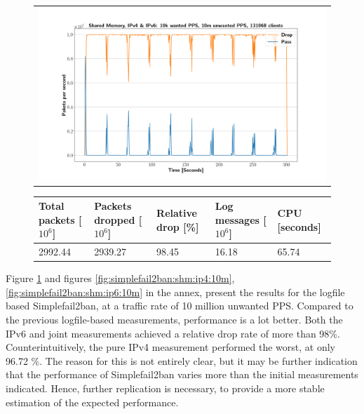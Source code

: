 \pagebreak

\begin{figure}[!h]
	\centering
	\scriptsize
	\begin{tabular}{c}
    	\centerline{\includegraphics[width=1.2\textwidth]{images/simplefail2ban_shm_ipv46_v10k_iv10m_c131068.png}}
	\end{tabular}
	\begin{tabular}{lllll}
		\toprule
		\textbf{Total packets [$10^6$]} & \textbf{Packets dropped [$10^6$]} & \textbf{Relative drop [\%]} & \textbf{Log messages [$10^6$]} & \textbf{CPU [seconds]} \\ \midrule 
		2992.44 & 2939.27 & 98.45 & 16.18 & 65.74 \\
		\bottomrule
	\end{tabular}
	\caption[Simplefail2ban, Shared Memory, IPv4 \& IPv6, 10m \ac{PPS}]{}
	\label{fig:simplefail2ban:shm:ip46:10m}
\end{figure}

Figure \ref{fig:simplefail2ban:shm:ip46:10m} and figures \ref{fig:simplefail2ban:shm:ip4:10m}, \ref{fig:simplefail2ban:shm:ip6:10m} in the annex, present the results
for the logfile based Simplefail2ban, at a traffic rate of 10 million unwanted \ac{PPS}. Compared to the previous logfile-based measurements,
performance is a lot better. Both the \ac{IPv6} and joint measurements achieved a relative drop rate of more than 98\%. Counterintuitively, the
pure \ac{IPv4} measurement performed the worst, at only 96.72 \%. The reason for this is not entirely clear, but it may be further
indication that the performance of Simplefail2ban varies more than the initial measurements indicated. Hence, further replication
is necessary, to provide a more stable estimation of the expected performance. 

